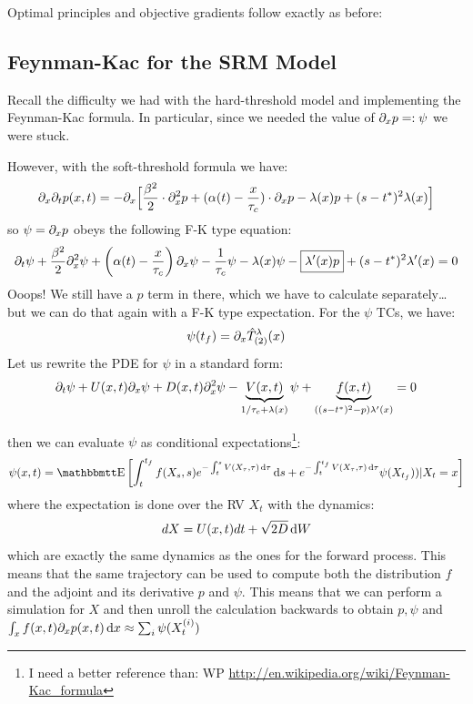 \documentclass{article}
\begin{document}
Optimal principles and objective gradients follow exactly as before:

\subsection{Feynman-Kac for the SRM Model}
Recall the difficulty we had with the hard-threshold model and implementing the
Feynman-Kac formula. In particular, since we needed the value of ${\partial}_x p =:
\psi$ we were stuck. 

However, with the soft-threshold formula we have:
$$
{\partial}_x {\partial}_t p(x,t) = 
			-{\partial}_x \Big[ \frac{{\beta}^2 }{2}\cdot {\partial}^2_x p +  
				({\alpha}(t)- \frac{x}{{ \tau_{c} }})  \cdot {\partial}_x p 
				- {\lambda}(x) p
				+ (s-{ t^* })^2 {\lambda}(x) 
			\Big] 
$$
so $\psi = {\partial}_x p$ obeys the following F-K type equation:
$$
{\partial}_t \psi  
+ \frac{{\beta}^2 }{2} {\partial}^2_x \psi 
+ \left({\alpha}(t)- \frac{x}{{ \tau_{c} }}\right) {\partial}_x \psi
- \frac{1}{{ \tau_{c} }}    \psi
-  {\lambda}(x) \psi
- \boxed{{\lambda}'(x) p}
+ (s-{ t^* })^2 {\lambda}'(x)
= 0
$$
Ooops! We still have a $p$ term in there, which we have to calculate
separately\ldots but we can do that again with a F-K type expectation. For the
$\psi$  TCs, we have:
$$
 \psi({ t_f }) = {\partial}_x { \hat{T}^{\lambda}_{(2)} }(x)
$$
 Let us rewrite the PDE for $\psi $ in a standard form:
 $$
 {\partial}_t \psi  
 +  U(x,t) {\partial}_x \psi 
 +  D(x,t) {\partial}^2_x \psi
 - \underbrace{V(x,t)}_{ 1 / { \tau_{c} } + {\lambda}(x)} \psi 
 + \underbrace{f(x,t)}_{( (s-{ t^* })^2  - p) {\lambda}'(x)} = 0
 $$
  
then we can evaluate $\psi$ as conditional expectations\footnote{I need a
better reference than: WP \url{http://en.wikipedia.org/wiki/Feynman-Kac_formula}}:
$$
\psi(x,t) = 
\Exp \left[
\int_t^\tf  f(X_s, s) e^{-\int_t^sV(X_\t,\t) \intd{\t}}
\intd{s}
+
e^{-\int_t^\tf V(X_\t,\t) \intd{\t}} \psi(X_\tf)) | X_t = x
\right] $$ 
where the expectation is done over the RV $X_t$  with the dynamics: $$
dX = U(x,t)dt + \sqrt{2D} \, \mathrm{d} W
$$
which are exactly the same dynamics as the ones for the forward process. This
means that the same trajectory can be used to compute both the distribution $f$
and the adjoint and its derivative $p$ and $\psi$. 
This means that we can perform a simulation for $X$ and then unroll the
calculation backwards to obtain $p, \psi$ and 
$\int_x f(x,t) {\partial}_x p(x,t) \, \mathrm{d} x \approx \sum_i \psi(X_t^{(i)} )$

\end{document}
